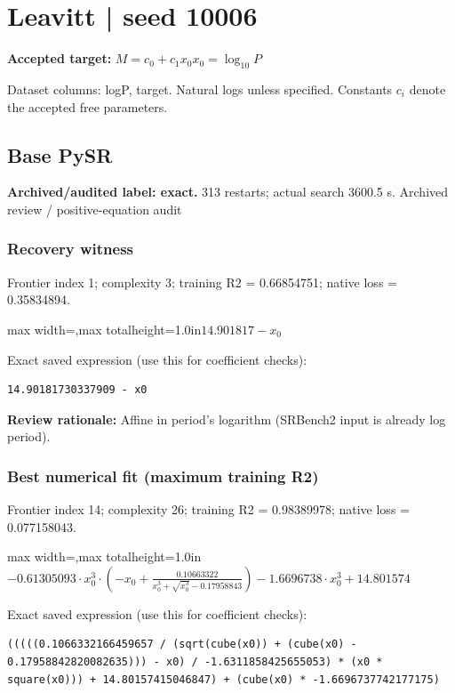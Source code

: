 \documentclass[10pt,letterpaper,landscape]{article}
\begin{document}
\section*{Leavitt | seed 10006}
\textbf{Accepted target:} $\displaystyle M=c_0+c_1x_0$\hfill $x_0=\log_{10}P$\par
{\small Dataset columns: logP, target. Natural logs unless specified. Constants $c_i$ denote the accepted free parameters.}\par\medskip
\begin{minipage}[t]{0.485\textwidth}
\subsection*{Base PySR}
\textbf{Archived/audited label: exact.} 313 restarts; actual search 3600.5 s.
{\small Archived review / positive-equation audit}
\subsubsection*{Recovery witness}
Frontier index 1; complexity 3; training R2 = 0.66854751; native loss = 0.35834894.
\begin{center}\begin{adjustbox}{max width=\linewidth,max totalheight=1.0in}$\displaystyle 14.901817 - x_{0}$\end{adjustbox}\end{center}
{\scriptsize Exact saved expression (use this for coefficient checks):}
\begin{lstlisting}
14.90181730337909 - x0
\end{lstlisting}
{\small\textbf{Review rationale:} Affine in period's logarithm (SRBench2 input is already log period).}
\subsubsection*{Best numerical fit (maximum training R2)}
Frontier index 14; complexity 26; training R2 = 0.98389978; native loss = 0.077158043.
\begin{center}\begin{adjustbox}{max width=\linewidth,max totalheight=1.0in}$\displaystyle - 0.61305093 \cdot x_{0}^{3} \cdot \left(- x_{0} + \frac{0.10663322}{x_{0}^{3} + \sqrt{x_{0}^{3}} - 0.17958843}\right) - 1.6696738 \cdot x_{0}^{3} + 14.801574$\end{adjustbox}\end{center}
{\scriptsize Exact saved expression (use this for coefficient checks):}
\begin{lstlisting}
(((((0.1066332166459657 / (sqrt(cube(x0)) + (cube(x0) - 0.17958842820082635))) - x0) / -1.6311858425655053) * (x0 * square(x0))) + 14.80157415046847) + (cube(x0) * -1.6696737742177175)
\end{lstlisting}
\end{minipage}\hfill
\end{document}
